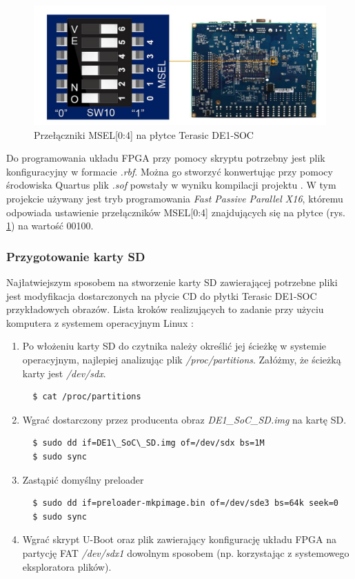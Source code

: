 \begin{figure}[!h]
\centering
\includegraphics[width=\textwidth]{pictures/msel.png}
\caption{Przełączniki MSEL[0:4] na płytce Terasic DE1-SOC}
\label{fig:msel}
\end{figure}

Do programowania układu FPGA przy pomocy skryptu potrzebny jest plik konfiguracyjny w formacie \textit{.rbf}. Można go stworzyć konwertując przy pomocy środowiska Quartus plik \textit{.sof} powstały w wyniku kompilacji projektu \cite{rocketboards-sof-to-rfb}. W tym projekcie używany jest tryb programowania \textit{Fast Passive Parallel X16}, któremu odpowiada ustawienie przełączników MSEL[0:4] znajdujących się na płytce (rys. \ref{fig:msel}) na wartość 00100.

\subsubsection{Przygotowanie karty SD}
Najłatwiejszym sposobem na stworzenie karty SD zawierającej potrzebne pliki jest modyfikacja dostarczonych na płycie CD do płytki Terasic DE1-SOC przykładowych obrazów. Lista kroków realizujących to zadanie przy użyciu komputera z systemem operacyjnym Linux \cite{rocketboards-booting-prebuild, rocketboards-updating-sd}:
\begin{enumerate}
\item Po włożeniu karty SD do czytnika należy określić jej ścieżkę w systemie operacyjnym, najlepiej analizując plik \textit{/proc/partitions}. Załóżmy, że ścieżką karty jest \textit{/dev/sdx}.
\begin{lstlisting}
  $ cat /proc/partitions
\end{lstlisting}

\item Wgrać dostarczony przez producenta obraz \textit{DE1\_SoC\_SD.img} \cite{terasic-sd} na kartę SD.
\begin{lstlisting}
  $ sudo dd if=DE1\_SoC\_SD.img of=/dev/sdx bs=1M
  $ sudo sync
\end{lstlisting}

\item Zastąpić domyślny preloader
\begin{lstlisting}
  $ sudo dd if=preloader-mkpimage.bin of=/dev/sde3 bs=64k seek=0
  $ sudo sync
\end{lstlisting}

\item Wgrać skrypt U-Boot oraz plik zawierający konfigurację układu FPGA na partycję FAT \textit{/dev/sdx1} dowolnym sposobem (np. korzystając z systemowego eksploratora plików).
\end{enumerate}

